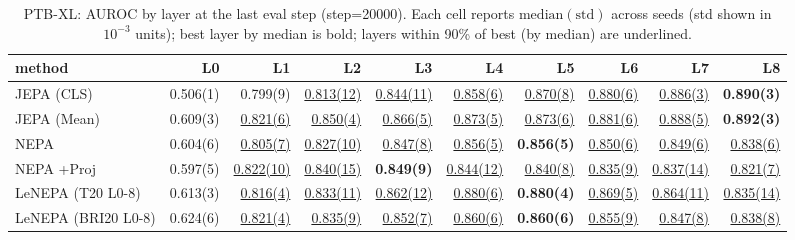 \begin{table}[t]
\centering
\scriptsize
\caption{PTB-XL: AUROC by layer at the last eval step (step=20000). Each cell reports $\mathrm{median}(\mathrm{std})$ across seeds (std shown in $10^{-3}$ units); best layer by median is bold; layers within 90\% of best (by median) are underlined.}
\label{tab:ptbxl_last_step_by_layer_auroc}
\begin{tabular}{lrrrrrrrrr}
\toprule
method & L0 & L1 & L2 & L3 & L4 & L5 & L6 & L7 & L8 \\
\midrule
JEPA (CLS) & 0.506(1) & 0.799(9) & \underline{0.813(12)} & \underline{0.844(11)} & \underline{0.858(6)} & \underline{0.870(8)} & \underline{0.880(6)} & \underline{0.886(3)} & \textbf{0.890(3)} \\
JEPA (Mean) & 0.609(3) & \underline{0.821(6)} & \underline{0.850(4)} & \underline{0.866(5)} & \underline{0.873(5)} & \underline{0.873(6)} & \underline{0.881(6)} & \underline{0.888(5)} & \textbf{0.892(3)} \\
NEPA & 0.604(6) & \underline{0.805(7)} & \underline{0.827(10)} & \underline{0.847(8)} & \underline{0.856(5)} & \textbf{0.856(5)} & \underline{0.850(6)} & \underline{0.849(6)} & \underline{0.838(6)} \\
NEPA +Proj & 0.597(5) & \underline{0.822(10)} & \underline{0.840(15)} & \textbf{0.849(9)} & \underline{0.844(12)} & \underline{0.840(8)} & \underline{0.835(9)} & \underline{0.837(14)} & \underline{0.821(7)} \\
LeNEPA (T20 L0-8) & 0.613(3) & \underline{0.816(4)} & \underline{0.833(11)} & \underline{0.862(12)} & \underline{0.880(6)} & \textbf{0.880(4)} & \underline{0.869(5)} & \underline{0.864(11)} & \underline{0.835(14)} \\
LeNEPA (BRI20 L0-8) & 0.624(6) & \underline{0.821(4)} & \underline{0.835(9)} & \underline{0.852(7)} & \underline{0.860(6)} & \textbf{0.860(6)} & \underline{0.855(9)} & \underline{0.847(8)} & \underline{0.838(8)} \\
\bottomrule
\end{tabular}
\end{table}
